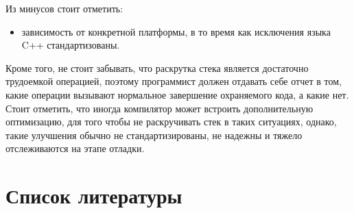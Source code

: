 \documentclass[14pt,a4paper,report]{report}
\begin{document}
Из минусов стоит отметить:

\begin{itemize}
	\item зависимость от конкретной платформы, в то время как исключения языка C++ стандартизованы.
\end{itemize}

Кроме того, не стоит забывать, что раскрутка стека является достаточно трудоемкой операцией, поэтому программист должен отдавать себе отчет в том, какие операции вызывают нормальное завершение охраняемого кода, а какие нет. Стоит отметить, что иногда компилятор может встроить дополнительную оптимизацию, для того чтобы не раскручивать стек в таких ситуациях, однако, такие улучшения обычно не стандартизированы, не надежны и тяжело отслеживаются на этапе отладки.

\section{Список литературы}
\end{document}
